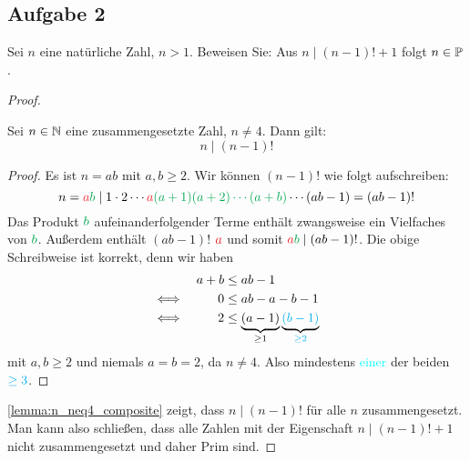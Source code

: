 \subsection{Aufgabe 2}
Sei $n$ eine natürliche Zahl, $n > 1$. Beweisen Sie: Aus $n \mid (n - 1)! + 1$
folgt $n \in \mathbb{P}{}$.
\begin{proof}
  \begin{lemma}
    \label{lemma:n_neq4_composite}
    Sei $n \in \mathbb{N}{}$ eine zusammengesetzte Zahl, $n \neq 4$. Dann gilt:
    \begin{equation*}
      n \mid (n - 1)!
    \end{equation*}
  \end{lemma}
  \begin{proof}
    Es ist $n = ab$ mit $a,b \geq 2$. Wir können $(n - 1)!$ wie folgt aufschreiben:
    \begin{equation*}
      n = \textcolor{Red}{a}\textcolor{Green}{b} \mid
      1 \cdot 2 \dotsm \textcolor{Red}{a}
      \textcolor{Green}{(a + 1)(a + 2) \dotsm (a + b)}
      \dotsm (ab - 1) = (ab - 1)!
    \end{equation*}
    Das Produkt $\textcolor{Green}{b}$ aufeinanderfolgender Terme
    enthält zwangsweise ein Vielfaches von $\textcolor{Green}{b}$.
    Außerdem enthält $(ab - 1)!$ $\textcolor{Red}{a}$ und somit
    $\textcolor{Red}{a}\textcolor{Green}{b} \mid (ab - 1)!$.\BigNewline
    Die obige Schreibweise ist korrekt, denn wir haben
    \begin{equation*}
      \begin{aligned}
             &  & a + b & \leq ab - 1                                     \\
        \iff &  & 0     & \leq ab - a - b - 1                             \\
        \iff &  & 2     & \leq \underbrace{(a - 1)}_{\geq 1}
        \underbrace{\textcolor{Cyan}{(b - 1)}}_{\textcolor{Cyan}{\geq 2}} \\
      \end{aligned}
    \end{equation*}
    mit $a,b \geq 2$ und niemals $a = b = 2$, da $n \neq 4$.
    Also mindestens \textcolor{Cyan}{einer} der beiden $\textcolor{Cyan}{\geq 3}$.
  \end{proof}
  \noindent
  \autoref{lemma:n_neq4_composite} zeigt, dass $n \mid (n - 1)!$ für alle $n$ zusammengesetzt.
  Man kann also schließen, dass alle Zahlen mit der Eigenschaft $n \mid (n - 1)! + 1$
  nicht zusammengesetzt und daher Prim sind.
\end{proof}

